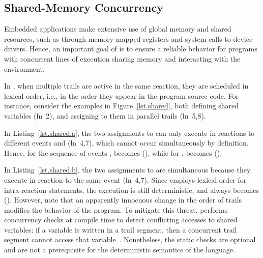 \subsection{Shared-Memory Concurrency}
\label{sec.ceu.shared}

Embedded applications make extensive use of global memory and shared resources,
such as through memory-mapped registers and system calls to device drivers.
Hence, an important goal of \CEU is to ensure a reliable behavior for programs
with concurrent lines of execution sharing memory and interacting with the
environment.

In \CEU, when multiple trails are active in the same reaction, they are
scheduled in lexical order, i.e., in the order they appear in the program
source code.
%
For instance, consider the examples in Figure~\ref{lst.shared}, both
defining shared variables (ln~2), and assigning to them in parallel trails
(ln~5,8).

In Listing~\ref{lst.shared.a}, the two assignments to  can only execute
in reactions to different events  and  (ln~4,7), which cannot
occur simultaneously by definition.
Hence, for the sequence of events ,  becomes 
(), while for ,  becomes 
().

In Listing~\ref{lst.shared.b}, the two assignments to  are simultaneous because
they execute in reaction to the same event  (ln~4,7).
Since \CEU employs lexical order for intra-reaction statements, the execution
is still deterministic, and  always becomes  ().
%
However, note that an apparently innocuous change in the order of trails
modifies the behavior of the program.
%
To mitigate this threat, \CEU performs concurrency checks at compile time to
detect conflicting accesses to shared variables:
if a variable is written in a trail segment, then a concurrent trail segment
cannot access that variable~\cite{ceu.sensys13}.
%
Nonetheless, the static checks are optional and are not a prerequisite for the
deterministic semantics of the language.

